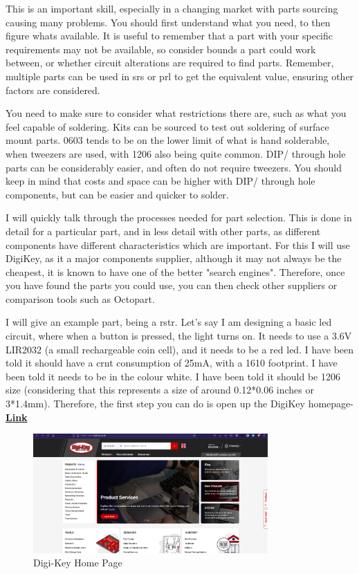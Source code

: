 \documentclass[a4paper,11pt]{report}
\let\oldhref\href %
\renewcommand{\href}[2]{\oldhref{#1}{\bfseries#2}}
\begin{document}
This is an important skill, especially in a changing market with parts sourcing causing many problems. You should first understand what you need, to then figure whats available. It is useful to remember that a part with your specific requirements may not be available, so consider bounds a part could work between, or whether circuit alterations are required to find parts. Remember, multiple parts can be used in \gls{srs} or \gls{prl} to get the equivalent value, ensuring other factors are considered.

You need to make sure to consider what restrictions there are, such as what you feel capable of soldering. Kits can be sourced to test out soldering of surface mount parts. 0603 tends to be on the lower limit of what is hand solderable, when tweezers are used, with 1206 also being quite common. DIP/ through hole parts can be considerably easier, and often do not require tweezers. You should keep in mind that costs and space can be higher with DIP/ through hole components, but can be easier and quicker to solder.

I will quickly talk through the processes needed for part selection. This is done in detail for a particular part, and in less detail with other parts, as different components have different characteristics which are important. For this I will use DigiKey, as it a major components supplier, although it may not always be the cheapest, it is known to have one of the better "search engines". Therefore, once you have found the parts you could use, you can then check other suppliers or comparison tools such as Octopart.

I will give an example part, being a \gls{rstr}. Let's say I am designing a basic \gls{led} circuit, where when a button is pressed, the light turns on. It needs to use a 3.6V LIR2032 (a small rechargeable coin cell), and it needs to be a red \gls{led}. I have been told it should have a \gls{crnt} consumption of 25mA, with a  1610 footprint. I have been told it needs to be in the colour white. I have been told it should be 1206 size (considering that this represents a size of around 0.12*0.06 inches or 3*1.4mm).
Therefore, the first step you can do is open up the DigiKey homepage- \href{https://www.DigiKey.co.uk/}{Link}

\begin{figure}[H]
\centering
\includegraphics[width=0.8\textwidth]{screenshots/DigiKeyHome}
\caption{Digi-Key Home Page}
\end{figure}
\end{document}
